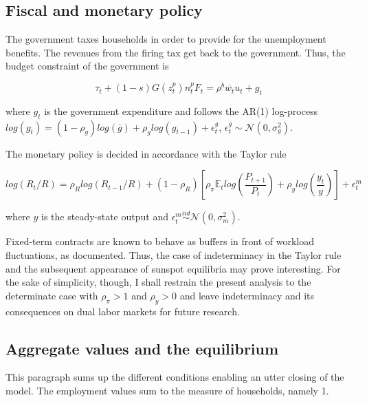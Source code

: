 \subsection{Fiscal and monetary policy}

The government taxes households in order to provide for the unemployment benefits. The revenues from the firing tax get back to the government. Thus, the budget constraint of the government is

\begin{equation}
\tau_t + (1-s) G\left( z_t^p \right) n_t^p F_t = \rho^b \overline{w_t} u_t + g_t
\end{equation}

where $g_t$ is the government expenditure and follows the AR(1) log-process $log\left(g_t\right) = \left(1-\rho_g\right) log\left(\overline{g}\right) + \rho_g log\left( g_{t-1} \right) + \epsilon_t^g$, $\epsilon_t^g \sim \mathcal{N} \left( 0, \sigma_g^2 \right)$.

The monetary policy is decided in accordance with the Taylor rule

\begin{equation}
log\left( R_{t} / R \right) = \rho_R log\left( R_{t-1} / R\right) + \left( 1 - \rho_R \right) \left[ \rho_{\pi} \mathbb{E}_t log \left( \frac{P_{t+1}}{P_t} \right) + \rho_y log\left(\frac{y_t}{y}\right) \right] + \epsilon_t^m \label{eq:taylor}
\end{equation}

where $y$ is the steady-state output and $\epsilon_t^m \overset{iid}{\sim} \mathcal{N} \left( 0, \sigma_m^2 \right)$.

Fixed-term contracts are known to behave as buffers in front of workload fluctuations, as \citet{saint1996dual} documented. Thus, the case of indeterminacy in the Taylor rule and the subsequent appearance of sunspot equilibria may prove interesting. For the sake of simplicity, though, I shall restrain the present analysis to the determinate case with $\rho_{\pi} > 1$ and $\rho_y > 0$ and leave indeterminacy and its consequences on dual labor markets for future research.

\subsection{Aggregate values and the equilibrium}

This paragraph sums up the different conditions enabling an utter closing of the model. The employment values sum to the measure of households, namely 1.

